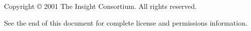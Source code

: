 \par
Copyright \copyright{} 2001 The Insight Consortium.
All rights reserved.

See the end of this document for complete license and permissions
information.
\par

